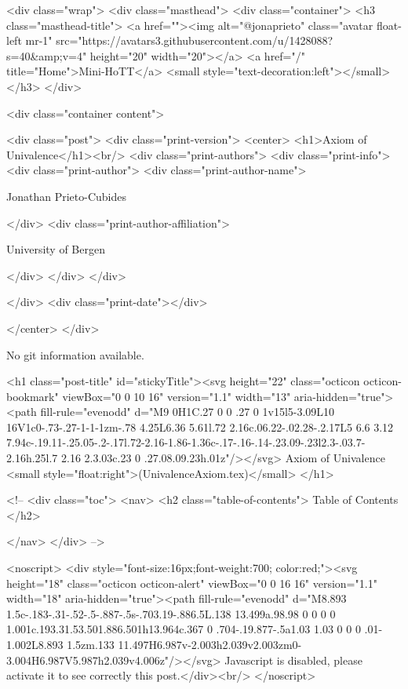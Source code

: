     <div class="wrap">
      <div class="masthead">
        <div class="container">
          <h3 class="masthead-title">
            <a href=""><img alt="@jonaprieto" class="avatar float-left mr-1" src="https://avatars3.githubusercontent.com/u/1428088?s=40&amp;v=4" height="20" width="20"></a>
            <a href="/" title="Home">Mini-HoTT</a>
            <small style="text-decoration:left"></small>
          </h3>
        </div>
      
      <div class="container content">
        







<div class="post">
  <div class="print-version">
    <center>
      <h1>Axiom of Univalence</h1><br/>
        <div class="print-authors">
          <div class="print-info">
            <div class="print-author">
              <div class="print-author-name">
                
                  Jonathan Prieto-Cubides
                
              </div>
              <div class="print-author-affiliation">
                
                  University of Bergen
                
                </div>
            </div>
          </div>
          
          
        </div>
        <div class="print-date"></div>
        
        
    </center>
  </div>

  
  No git information available.
  

  <h1 class="post-title" id="stickyTitle"><svg height="22" class="octicon octicon-bookmark" viewBox="0 0 10 16" version="1.1" width="13" aria-hidden="true"><path fill-rule="evenodd" d="M9 0H1C.27 0 0 .27 0 1v15l5-3.09L10 16V1c0-.73-.27-1-1-1zm-.78 4.25L6.36 5.61l.72 2.16c.06.22-.02.28-.2.17L5 6.6 3.12 7.94c-.19.11-.25.05-.2-.17l.72-2.16-1.86-1.36c-.17-.16-.14-.23.09-.23l2.3-.03.7-2.16h.25l.7 2.16 2.3.03c.23 0 .27.08.09.23h.01z"/></svg> Axiom of Univalence <small style="float:right">(UnivalenceAxiom.tex)</small>
  </h1>

  <!-- 
  <div class="toc">
    <nav>
    <h2 class="table-of-contents"> Table of Contents </h2>
      

    </nav>
  </div>
   -->

  <noscript>
  <div style="font-size:16px;font-weight:700; color:red;"><svg height="18" class="octicon octicon-alert" viewBox="0 0 16 16" version="1.1" width="18" aria-hidden="true"><path fill-rule="evenodd" d="M8.893 1.5c-.183-.31-.52-.5-.887-.5s-.703.19-.886.5L.138 13.499a.98.98 0 0 0 0 1.001c.193.31.53.501.886.501h13.964c.367 0 .704-.19.877-.5a1.03 1.03 0 0 0 .01-1.002L8.893 1.5zm.133 11.497H6.987v-2.003h2.039v2.003zm0-3.004H6.987V5.987h2.039v4.006z"/></svg> Javascript is disabled, please activate it to see correctly this post.</div><br/>
  </noscript>

